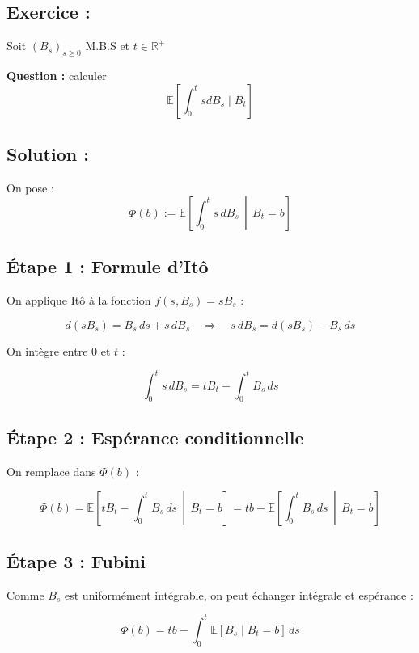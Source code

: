 \subsection*{Exercice :}

\begin{exerciseBox}
Soit $(B_s)_{s \geq 0}$ M.B.S et $t \in \mathbb{R}^+$

\textbf{Question :} calculer 
$$
\mathbb{E}\left[ \int_0^t s dB_s \mid B_t  \right] 
$$
\end{exerciseBox}


\subsection*{Solution :}

On pose :
\[
\Phi(b) := \mathbb{E} \left[ \int_0^t s\, dB_s \,\middle|\, B_t = b \right]
\]

\subsection*{Étape 1 : Formule d'Itô}

On applique Itô à la fonction \( f(s, B_s) = s B_s \) :

\[
d(s B_s) = B_s\, ds + s\, dB_s
\quad \Rightarrow \quad
s\, dB_s = d(s B_s) - B_s\, ds
\]

On intègre entre 0 et \( t \) :

\[
\int_0^t s\, dB_s = t B_t - \int_0^t B_s\, ds
\]


\subsection*{Étape 2 : Espérance conditionnelle}

On remplace dans \( \Phi(b) \) :

\[
\Phi(b) = \mathbb{E} \left[ t B_t - \int_0^t B_s\, ds \,\middle|\, B_t = b \right]
= t b - \mathbb{E} \left[ \int_0^t B_s\, ds \,\middle|\, B_t = b \right]
\]


\subsection*{Étape 3 : Fubini}

Comme \( B_s \) est uniformément intégrable, on peut échanger intégrale et espérance :

\[
\Phi(b) = t b - \int_0^t \mathbb{E}[B_s \mid B_t = b]\, ds
\]


